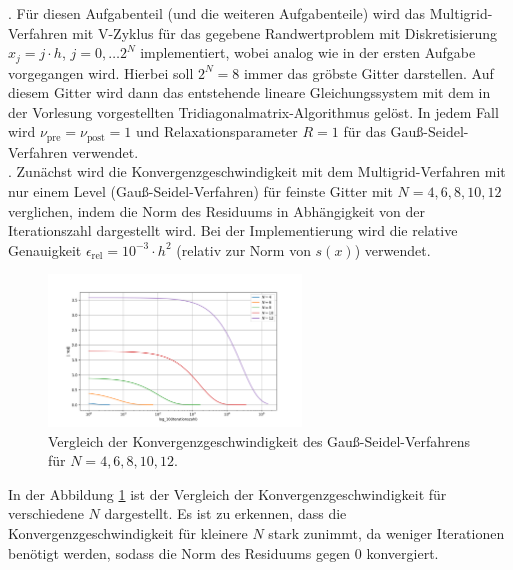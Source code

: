 \documentclass[11pt,a4paper]{article}
\begin{document}
. Für diesen Aufgabenteil (und die weiteren Aufgabenteile) wird das Multigrid-Verfahren mit V-Zyklus für das gegebene Randwertproblem mit Diskretisierung $x_j = j \cdot h$, $j = 0 , \dots 2^N$ implementiert, wobei analog
wie in der ersten Aufgabe vorgegangen wird. Hierbei soll $2^N = 8$ immer das gröbste Gitter darstellen. Auf diesem Gitter wird dann das entstehende lineare Gleichungssystem mit dem in der Vorlesung vorgestellten Tridiagonalmatrix-Algorithmus gelöst.
In jedem Fall wird $\nu_{\mathrm{pre}} = \nu_{\mathrm{post}} = 1$ und Relaxationsparameter $R = 1$ für das Gauß-Seidel-Verfahren verwendet. \\

. Zunächst wird die Konvergenzgeschwindigkeit mit dem Multigrid-Verfahren mit nur einem Level (Gauß-Seidel-Verfahren) für feinste Gitter mit $N = 4,6,8,10,12$ verglichen, indem die Norm des Residuums in Abhängigkeit von der
Iterationszahl dargestellt wird. Bei der Implementierung wird die relative Genauigkeit $\epsilon_{\mathrm{rel}} = 10^{-3} \cdot h^2$ (relativ zur Norm von $s(x)$) verwendet.
\begin{figure}[h]
    \centering
    \includegraphics[width=0.6\textwidth]{h2_N_comparison_1}
    \caption[Vergleich der Konvergenzgeschwindigkeit des Gauß-Seidel-Verfahrens für $N = 4,6,8,10,12$.]{Vergleich der Konvergenzgeschwindigkeit des Gauß-Seidel-Verfahrens für $N = 4,6,8,10,12$.}\label{fig:h2_N_comparison_1}
\end{figure} In der Abbildung \ref{fig:h2_N_comparison_1} ist der Vergleich der Konvergenzgeschwindigkeit für verschiedene $N$ dargestellt. Es ist zu erkennen, dass
die Konvergenzgeschwindigkeit für kleinere $N$ stark zunimmt, da weniger Iterationen benötigt werden, sodass die Norm des Residuums gegen $0$ konvergiert.\\
\end{document}
